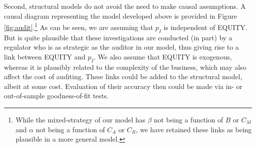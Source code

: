 Second, structural models do not avoid the need to make causal assumptions.
A causal diagram representing the model developed above is provided in Figure \ref{fig:audit}.\footnote{
While the mixed-strategy of our model has $\beta$ not being a function of $B$ or $C_M$ and $\alpha$ not being a function of $C_A$ or $C_R$, we have retained these links as being plausible in a more general model.}
As can be seen, we are assuming that $p_I$ is independent of EQUITY. 
But is quite plausible that these investigations are conducted (in part) by a regulator who is as strategic as the auditor in our model, thus giving rise to a link between EQUITY and $p_I$.
We also assume that EQUITY is exogenous, whereas it is plausibly related to the complexity of the business, which may also affect the cost of auditing.
These links could be added to the structural model, albeit at some cost.
Evaluation of their accuracy then could be made via in- or out-of-sample goodness-of-fit tests.

